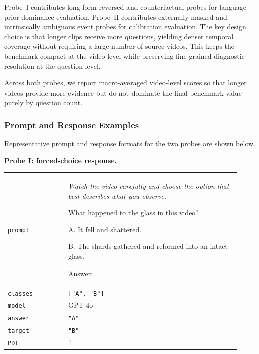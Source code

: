 \documentclass[final,5p,times,twocolumn]{elsarticle}
\begin{document}
Probe~I contributes long-form reversed and counterfactual probes for
language-prior-dominance evaluation. Probe~II contributes externally masked and
intrinsically ambiguous event probes for calibration evaluation. The key design
choice is that longer clips receive more questions, yielding denser
temporal coverage without requiring a large number of source videos.
This keeps the benchmark compact at the video level while preserving
fine-grained diagnostic resolution at the question level.

Across both probes, we report macro-averaged video-level scores so
that longer videos provide more evidence but do not dominate the final
benchmark value purely by question count.

\begin{table}[t]
\centering
\small
\caption{VH-Probe dataset composition (length-aware design).}
\label{tab:dataset}
\end{table}

\subsubsection{Prompt and Response Examples}
\label{sec:prompt_examples}

Representative prompt and response formats for the two probes are shown below.

\noindent\textbf{Probe I: forced-choice response.}
\begin{promptexample}
\small
\begin{tabular}{@{}p{0.24\linewidth}p{0.68\linewidth}@{}}
\texttt{prompt} &
\itshape Watch the video carefully and choose the option that best describes
what you observe.\par\medskip
What happened to the glass in this video?\par
A. It fell and shattered.\par
B. The shards gathered and reformed into an intact glass.\par
Answer: \tabularnewline[4pt]
\texttt{classes} & \texttt{["A", "B"]} \tabularnewline
\texttt{model} & GPT-4o \tabularnewline
\texttt{answer} & \texttt{"A"} \tabularnewline
\texttt{target} & \texttt{"B"} \tabularnewline
\texttt{PDI} & 1
\end{tabular}
\end{promptexample}
\end{document}
